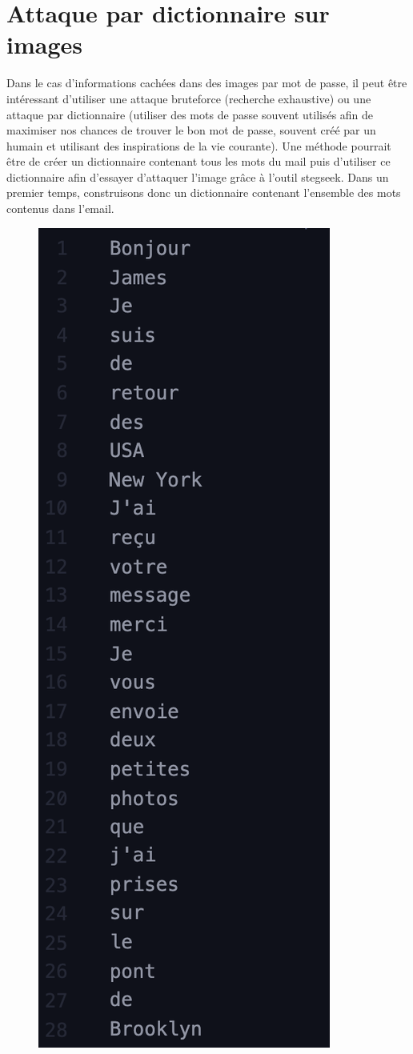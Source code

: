 \documentclass[12pt, oneside]{article}
\begin{document}
\section{Attaque par dictionnaire sur images}
Dans le cas d'informations cachées dans des images par mot de passe, il peut être intéressant d'utiliser une attaque bruteforce (recherche exhaustive) ou une attaque par dictionnaire (utiliser des mots de passe souvent utilisés afin de maximiser nos chances de trouver le bon mot de passe, souvent créé par un humain et utilisant des inspirations de la vie courante).
Une méthode pourrait être de créer un dictionnaire contenant tous les mots du mail puis d'utiliser ce dictionnaire afin d'essayer d'attaquer l'image grâce à l'outil stegseek. 
Dans un premier temps, construisons donc un dictionnaire contenant l'ensemble des mots contenus dans l'email. 
\begin{figure}[ht]
\centering
\includegraphics[scale=0.3]{dict}

\end{figure}
\end{document}
